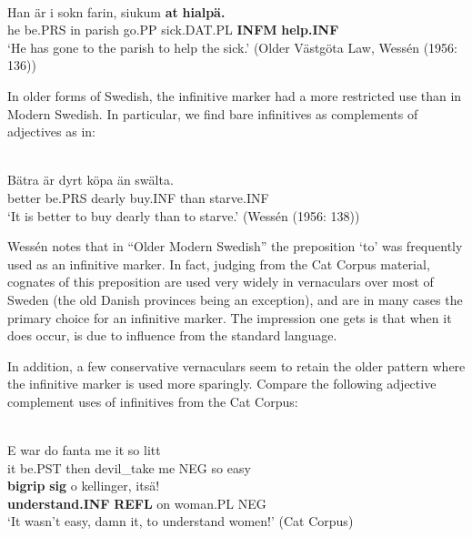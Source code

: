 
\ea\label{}
\\
\gll Han  är  i  sokn  farin,  siukum  \textbf{at} \textbf{hialpä.}\\
he  be.PRS  in  parish  go.PP  sick.DAT.PL  \textbf{INFM} \textbf{help.INF}\\
\glt ‘He has gone to the parish to help the sick.’ (Older Västgöta Law, Wessén (1956: 136)) 
\z

In older forms of Swedish, the infinitive marker had a more restricted use than in Modern Swedish. In particular, we find bare infinitives as complements of adjectives as in:


\ea\label{}
\\
\gll Bätra  är  dyrt  köpa  än  swälta.  \\
better  be.PRS  dearly  buy.INF  than  starve.INF  \\
\glt ‘It is better to buy dearly than to starve.’ (Wessén (1956: 138))
\z

Wessén notes that in “Older Modern Swedish” the preposition  ‘to’ was frequently used as an infinitive marker. In fact, judging from the Cat Corpus material, cognates of this preposition are used very widely in vernaculars over most of Sweden (the old Danish provinces being an exception), and are in many cases the primary choice for an infinitive marker. The impression one gets is that when it does occur, is due to influence from the standard language. 



In addition, a few conservative vernaculars seem to retain the older pattern where the infinitive marker is used more sparingly. Compare the following adjective complement uses of infinitives from the Cat Corpus:



\ea\label{}
\\
\gll E  war  do  fanta  me  it  so  litt\\
it  be.PST  then  devil\_take  me  NEG  so  easy\\
\gll \textbf{bigrip} \textbf{sig} o  kellinger,  itsä!\\
\textbf{understand.INF} \textbf{REFL} on  woman.PL  NEG\\
\glt  ‘It wasn’t easy, damn it, to understand women!’ (Cat Corpus)
\z

